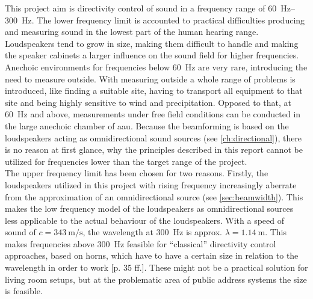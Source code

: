 This project aim is directivity control of sound in a frequency range of \SIrange{60}{300}{\hertz}. The lower frequency limit is accounted to practical difficulties producing and measuring sound in the lowest part of the human hearing range. Loudspeakers tend to grow in size, making them difficult to handle and making the speaker cabinets a larger influence on the sound field for higher frequencies. Anechoic environments for frequencies below \SI{60}{\hertz} are very rare, introducing the need to measure outside. With measuring outside a whole range of problems is introduced, like finding a suitable site, having to transport all equipment to that site and being highly sensitive to wind and precipitation. Opposed to that, at \SI{60}{\hertz} and above, measurements under free field conditions can be conducted in the large anechoic chamber of \gls{aau}. Because the beamforming is based on the loudspeakers acting as omnidirectional sound sources (see \autoref{ch:directional}), there is no reason at first glance, why the principles described in this report cannot be utilized for frequencies lower than the target range of the project.\\
The upper frequency limit has been chosen for two reasons. Firstly, the loudspeakers utilized in this project with rising frequency increasingly aberrate from the approximation of an omnidirectional source (see \autoref{sec:beamwidth}). This makes the low frequency model of the loudspeakers as omnidirectional sources less applicable to the actual behaviour of the loudspeakers. With a speed of sound of $c=\SI{343}{\meter\per\second}$, the wavelength at \SI{300}{\hertz} is approx. $\lambda=\SI{1.14}{\meter}$. This makes frequencies above \SI{300}{\hertz} feasible for ``classical'' directivity control approaches, based on horns, which have to have a certain size in relation to the wavelength in order to work \citep{Borwick2012}[p. 35 ff.]. These might not be a practical solution for living room setups, but at the problematic area of public address systems the size is feasible.\\

